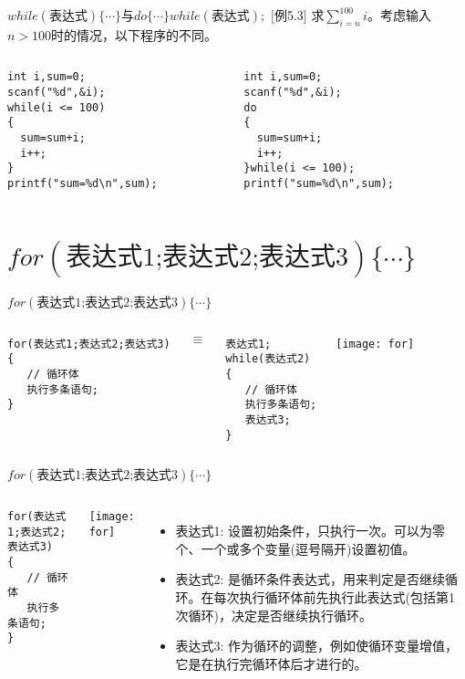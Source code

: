 \begin{frame}{$while(\text{表达式})\{ \cdots\}$与$do \{\cdots\} while(\text{表达式});$}
$[$例5.3$]$ 求$\sum\limits_{i=n}^{100}i$。考虑输入$n>100$时的情况，以下程序的不同。
\begin{columns}
\begin{lstlisting}[frame=single]
int i,sum=0;
scanf("%d",&i);      
while(i <= 100)     
{                   
  sum=sum+i;          
  i++;               
}                  
printf("sum=%d\n",sum);               
\end{lstlisting}
\begin{lstlisting}[frame=single]
int i,sum=0;
scanf("%d",&i); 
do     
{                   
  sum=sum+i;          
  i++;                
}while(i <= 100);   
printf("sum=%d\n",sum);                
\end{lstlisting}
\end{columns}
\end{frame}

\section{$for(\text{表达式1;表达式2;表达式3}) \{\cdots\}$}

\begin{frame}{$for(\text{表达式1;表达式2;表达式3}) \{\cdots\}$}
\vspace{-0.4cm}
\begin{columns}
\begin{lstlisting}[frame=single] 
for(表达式1;表达式2;表达式3)
{
   // 循环体
   执行多条语句;  
}
\end{lstlisting}
$\equiv$
\begin{lstlisting}[frame=single] 
表达式1;
while(表达式2)
{
   // 循环体
   执行多条语句;
   表达式3;  
}
\end{lstlisting}
\texttt{[image: for]}
\end{columns}
\end{frame}

\begin{frame}{$for(\text{表达式1;表达式2;表达式3}) \{\cdots\}$}
\begin{columns}
\begin{lstlisting}[frame=single] 
for(表达式1;表达式2;表达式3)
{
   // 循环体
   执行多条语句;  
}
\end{lstlisting}
\texttt{[image: for]}
\begin{itemize}
\item 表达式1: 设置初始条件，只执行一次。可以为零个、一个或多个变量(逗号隔开)设置初值。
\item 表达式2: 是循环条件表达式，用来判定是否继续循环。在每次执行循环体前先执行此表达式(包括第1次循环)，决定是否继续执行循环。
\item 表达式3: 作为循环的调整，例如使循环变量增值，它是在执行完循环体后才进行的。	
\end{itemize}
\end{columns}
\end{frame}


